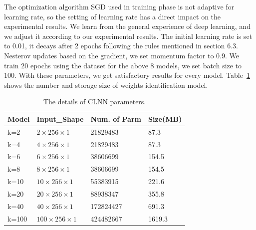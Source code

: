 \documentclass[conference]{IEEEtran}
\begin{document}
The optimization algorithm SGD used in training phase is not adaptive for learning rate, so the setting of learning rate has a direct impact on the experimental results. We learn from the general experience of deep learning, and we adjust it according to our experimental results. The initial learning rate is set to 0.01, it decays after 2 epochs following the rules mentioned in section 6.3.  Nesterov updates based on the gradient, we set momentum factor to 0.9. We train 20 epochs using the dataset for the above 8 models, we set batch size to 100. With these parameters, we get satisfactory results for every model. Table~\ref{tab:params} shows the number and storage size of weights identification model.
\begin{table}
  \caption{The details of CLNN parameters.}
  \label{tab:params}
  \centering
  \begin{tabular}{l l l l}
    \hline
    \textbf{Model} & \textbf{Input\_Shape} & \textbf{Num. of Parm}&\textbf{Size(MB)}\\
    \hline
    k=2      & ${2 \times 256 \times 1}$  & 21829483  &87.3  \\
    k=4      & ${4 \times 256 \times 1}$  & 21829483  &87.3  \\
    k=6      & ${6 \times 256 \times 1}$  & 38606699  &154.5  \\
    k=8      & ${8 \times 256 \times 1}$  & 38606699  &154.5 \\
    k=10     & ${10 \times 256 \times 1}$  & 55383915  &221.6  \\
    k=20     & ${20 \times 256 \times 1}$  & 88938347  &355.8 \\
    k=40     & ${40 \times 256 \times 1}$  & 172824427  &691.3  \\
    k=100    & ${100 \times 256 \times 1}$  & 424482667  &1619.3  \\
    \hline
  \end{tabular}
\end{table}
\end{document}
